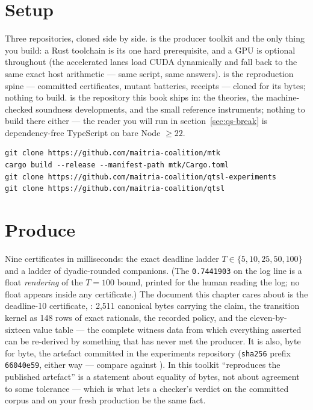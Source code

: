 \section{Setup}
\label{sec:qs-setup}

Three repositories, cloned side by side. 
is the producer toolkit and the only thing you build: a Rust
toolchain is its one hard prerequisite, and a GPU is optional
throughout (the accelerated lanes load CUDA dynamically and fall back
to the same exact host arithmetic --- same script, same answers).
 is the reproduction spine
--- committed certificates, mutant batteries, receipts --- cloned for
its bytes; nothing to build.  is the
repository this book ships in: the theories, the machine-checked
soundness developments, and the small reference instruments; nothing
to build there either --- the reader you will run in
section~\ref{sec:qs-break} is dependency-free TypeScript on bare Node
$\ge 22$.

\begin{Verbatim}[fontsize=\small,frame=leftline,rulecolor=\color{accentmid},framesep=3mm,xleftmargin=3mm]
git clone https://github.com/maitria-coalition/mtk
cargo build --release --manifest-path mtk/Cargo.toml
git clone https://github.com/maitria-coalition/qtsl-experiments
git clone https://github.com/maitria-coalition/qtsl
\end{Verbatim}

\section{Produce}
\label{sec:qs-produce}



Nine certificates in milliseconds: the exact deadline ladder
$T \in \{5, 10, 25, 50, 100\}$ and a ladder of dyadic-rounded
companions. (The \texttt{0.7441903} on the log line is a float
\emph{rendering} of the $T{=}100$ bound, printed for the human reading
the log; no float appears inside any certificate.) The document this
chapter cares about is the deadline-10 certificate,
: 2{,}511 canonical bytes
carrying the claim, the transition kernel as 148 rows of exact
rationals, the recorded policy, and the eleven-by-sixteen value table
--- the complete witness data from which everything asserted can be
re-derived by something that has never met the producer. It is also,
byte for byte, the artefact committed in the experiments repository
(\texttt{sha256} prefix \texttt{66040e59}, either way --- compare
against ). In
this toolkit ``reproduces the published artefact'' is a statement
about equality of bytes, not about agreement to some tolerance ---
which is what lets a checker's verdict on the committed corpus and on
your fresh production be the same fact.


